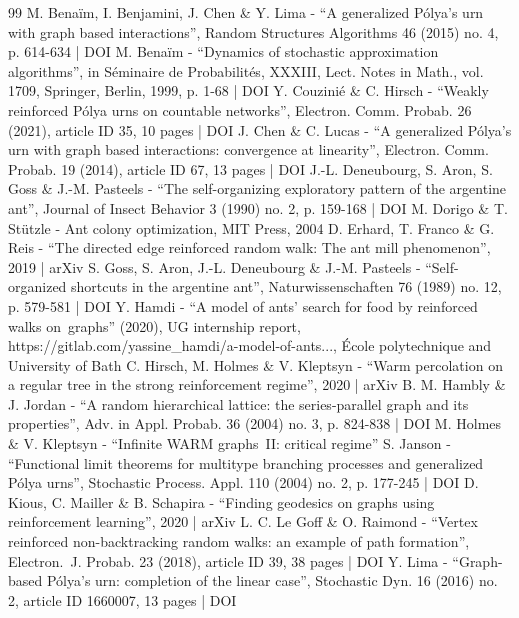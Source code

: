 \begin{thebibliography}{99}
M. Benaïm, I. Benjamini, J. Chen \& Y. Lima - “A generalized Pólya’s urn with graph based interactions”, Random Structures Algorithms 46 (2015) no. 4, p. 614-634 | DOI
M. Benaïm - “Dynamics of stochastic approximation algorithms”, in Séminaire de Probabilités, XXXIII, Lect. Notes in Math., vol. 1709, Springer, Berlin, 1999, p. 1-68 | DOI
Y. Couzinié \& C. Hirsch - “Weakly reinforced Pólya urns on countable networks”, Electron. Comm. Probab. 26 (2021), article ID 35, 10 pages | DOI
J. Chen \& C. Lucas - “A generalized Pólya’s urn with graph based interactions: convergence at linearity”, Electron. Comm. Probab. 19 (2014), article ID 67, 13 pages | DOI
J.-L. Deneubourg, S. Aron, S. Goss \& J.-M. Pasteels - “The self-organizing exploratory pattern of the argentine ant”, Journal of Insect Behavior 3 (1990) no. 2, p. 159-168 | DOI
M. Dorigo \& T. Stützle - Ant colony optimization, MIT Press, 2004
D. Erhard, T. Franco \& G. Reis - “The directed edge reinforced random walk: The ant mill phenomenon”, 2019 | arXiv
S. Goss, S. Aron, J.-L. Deneubourg \& J.-M. Pasteels - “Self-organized shortcuts in the argentine ant”, Naturwissenschaften 76 (1989) no. 12, p. 579-581 | DOI
Y. Hamdi - “A model of ants’ search for food by reinforced walks on graphs” (2020), UG internship report, https://gitlab.com/yassine\_hamdi/a-model-of-ants..., École polytechnique and University of Bath
C. Hirsch, M. Holmes \& V. Kleptsyn - “Warm percolation on a regular tree in the strong reinforcement regime”, 2020 | arXiv
B. M. Hambly \& J. Jordan - “A random hierarchical lattice: the series-parallel graph and its properties”, Adv. in Appl. Probab. 36 (2004) no. 3, p. 824-838 | DOI
M. Holmes \& V. Kleptsyn - “Infinite WARM graphs II: critical regime”
S. Janson - “Functional limit theorems for multitype branching processes and generalized Pólya urns”, Stochastic Process. Appl. 110 (2004) no. 2, p. 177-245 | DOI
D. Kious, C. Mailler \& B. Schapira - “Finding geodesics on graphs using reinforcement learning”, 2020 | arXiv
L. C. Le Goff \& O. Raimond - “Vertex reinforced non-backtracking random walks: an example of path formation”, Electron. J. Probab. 23 (2018), article ID 39, 38 pages | DOI
Y. Lima - “Graph-based Pólya’s urn: completion of the linear case”, Stochastic Dyn. 16 (2016) no. 2, article ID 1660007, 13 pages | DOI

\end{thebibliography}
